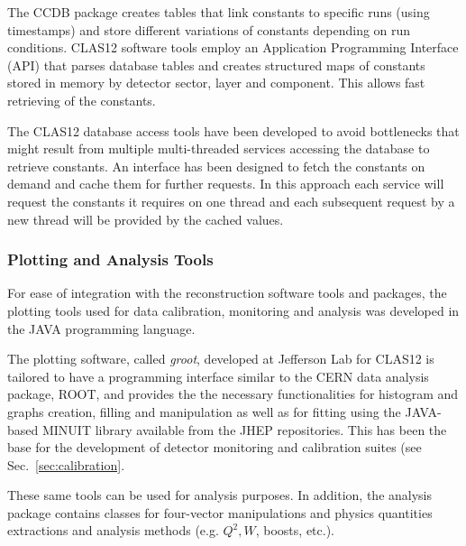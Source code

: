The CCDB package creates
tables that link constants to specific runs (using timestamps) and store different variations of constants depending on run
conditions. CLAS12 software tools employ an Application Programming Interface (API) that parses database tables and creates
structured maps of constants stored in  memory by detector sector, layer and component. This allows fast retrieving of the
constants.

The CLAS12 database access tools have been developed to avoid bottlenecks that might result from multiple multi-threaded
services accessing the database to retrieve constants.  An interface has been designed to fetch the constants
on demand and cache them for further requests. In this approach each service will request the
constants it requires on one thread and each subsequent request by a new thread will be provided by the cached values.

\subsubsection{Plotting and Analysis Tools}

For ease of integration with the reconstruction software tools and packages, the plotting tools used for data
calibration, monitoring and analysis was developed in the JAVA programming language.

The plotting software, called {\it groot}, developed at Jefferson Lab for CLAS12 is tailored to have a programming
interface similar to the CERN data analysis package, ROOT, and provides the the necessary functionalities for histogram and graphs creation, filling and manipulation as well as for fitting using the JAVA-based MINUIT library available from the JHEP repositories. This has been the base for the development of detector monitoring and calibration suites (see Sec.~\ref{sec:calibration}.

These same tools can be used for analysis purposes. In addition, the analysis package contains classes for four-vector manipulations and physics quantities extractions and
analysis methods (e.g. $Q^2, W$, boosts, etc.).

